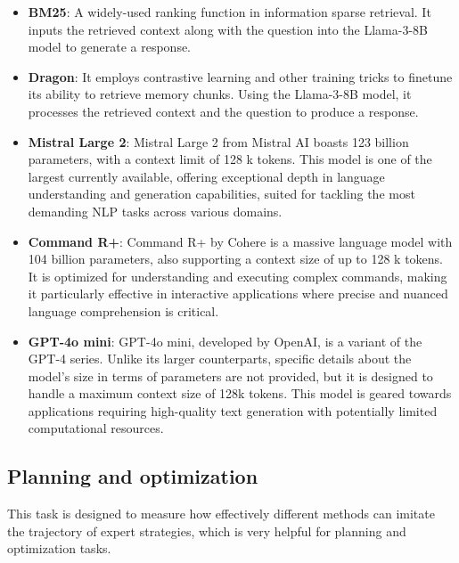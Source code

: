  \begin{itemize}[leftmargin=1em, itemsep=0pt] 
 
\item \textbf{BM25}:  A widely-used ranking function in information sparse retrieval. It inputs the retrieved context along with the question into the Llama-3-8B model to generate a response.

\item  \textbf{Dragon}: It employs contrastive learning and other training tricks to finetune its ability to retrieve memory chunks. Using the Llama-3-8B model, it processes the retrieved context and the question to produce a response.

\item \textbf{Mistral Large 2}: Mistral Large 2 from Mistral AI boasts 123 billion parameters, with a context limit of 128 k tokens. This model is one of the largest currently available, offering exceptional depth in language understanding and generation capabilities, suited for tackling the most demanding NLP tasks across various domains. 

\item \textbf{Command R+}: Command R+ by Cohere is a massive language model with 104 billion parameters, also supporting a context size of up to 128 k tokens. It is optimized for understanding and executing complex commands, making it particularly effective in interactive applications where precise and nuanced language comprehension is critical.
 
\item  \textbf{GPT-4o mini}: GPT-4o mini, developed by OpenAI, is a variant of the GPT-4 series. Unlike its larger counterparts, specific details about the model's size in terms of parameters are not provided, but it is designed to handle a maximum context size of 128k tokens. This model is geared towards applications requiring high-quality text generation with potentially limited computational resources.

\end{itemize}



\subsection{Planning and optimization} \label{apd:opt}

This task is designed to measure how effectively different methods can imitate the trajectory of expert strategies, which is very helpful for planning and optimization tasks.


